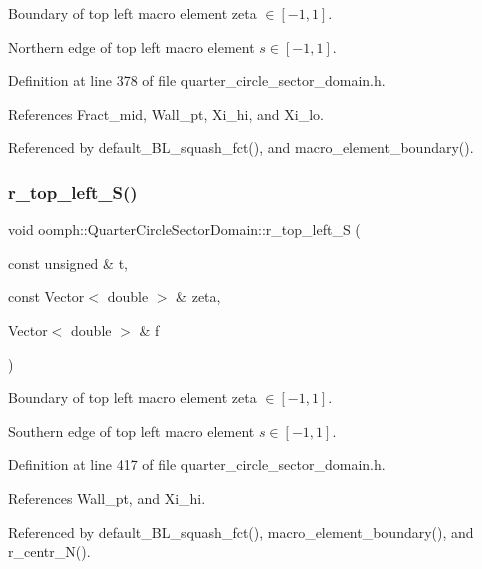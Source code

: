 Boundary of top left macro element zeta $ \in [-1,1] $. 

Northern edge of top left macro element $ s \in [-1,1] $. 

Definition at line 378 of file quarter\+\_\+circle\+\_\+sector\+\_\+domain.\+h.



References Fract\+\_\+mid, Wall\+\_\+pt, Xi\+\_\+hi, and Xi\+\_\+lo.



Referenced by default\+\_\+\+B\+L\+\_\+squash\+\_\+fct(), and macro\+\_\+element\+\_\+boundary().

\mbox{\label{classoomph_1_1QuarterCircleSectorDomain_a0bb74af9c782bd0a0a8d3ccfd708af55}} 
\subsubsection{\texorpdfstring{r\+\_\+top\+\_\+left\+\_\+\+S()}{r\_top\_left\_S()}}
{\footnotesize\ttfamily void oomph\+::\+Quarter\+Circle\+Sector\+Domain\+::r\+\_\+top\+\_\+left\+\_\+S (\begin{DoxyParamCaption}\item[{const unsigned \&}]{t,  }\item[{const Vector$<$ double $>$ \&}]{zeta,  }\item[{Vector$<$ double $>$ \&}]{f }\end{DoxyParamCaption})\hspace{0.3cm}{\ttfamily [private]}}



Boundary of top left macro element zeta $ \in [-1,1] $. 

Southern edge of top left macro element $ s \in [-1,1] $. 

Definition at line 417 of file quarter\+\_\+circle\+\_\+sector\+\_\+domain.\+h.



References Wall\+\_\+pt, and Xi\+\_\+hi.



Referenced by default\+\_\+\+B\+L\+\_\+squash\+\_\+fct(), macro\+\_\+element\+\_\+boundary(), and r\+\_\+centr\+\_\+\+N().

